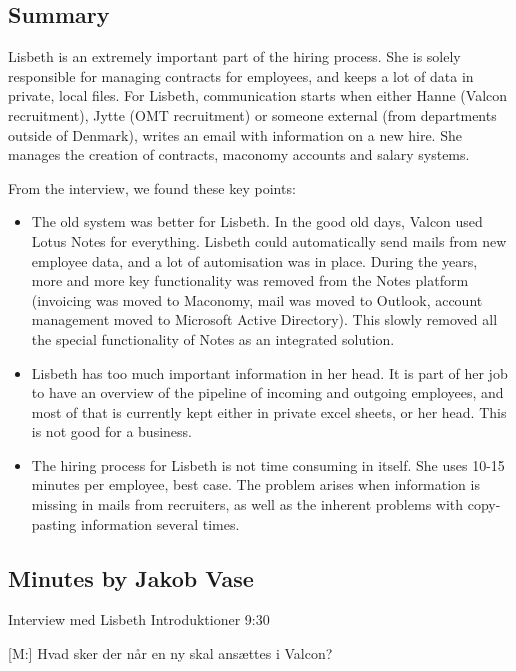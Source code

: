 \label{app:lisbeth}

\subsection{Summary}
Lisbeth is an extremely important part of the hiring process. She is solely responsible for managing contracts for employees, and keeps a lot of data in private, local files. 
For Lisbeth, communication starts when either Hanne (Valcon recruitment), Jytte (OMT recruitment) or someone external (from departments outside of Denmark), writes an email with information on a new hire.
She manages the creation of contracts, maconomy accounts and salary systems.

From the interview, we found these key points:
\begin{itemize}
	\item{The old system was better for Lisbeth.}
		In the good old days, Valcon used Lotus Notes for everything. Lisbeth could automatically send mails from new employee data, and a lot of automisation was in place. During the years, more and more key functionality was removed from the Notes platform (invoicing was moved to Maconomy, mail was moved to Outlook, account management moved to Microsoft Active Directory). This slowly removed all the special functionality of Notes as an integrated solution.
	\item{Lisbeth has too much important information in her head.}
		 It is part of her job to have an overview of the pipeline of incoming and outgoing employees, and most of that is currently kept either in private excel sheets, or her head. This is not good for a business.
	\item{The hiring process for Lisbeth is not time consuming in itself.}  
		She uses 10-15 minutes per employee, best case. The problem arises when information is missing in mails from recruiters, as well as the inherent problems with copy-pasting information several times.
\end{itemize}


\subsection{Minutes by Jakob Vase}

Interview med Lisbeth
Introduktioner
9:30

[M:] Hvad sker der når en ny skal ansættes i Valcon?

